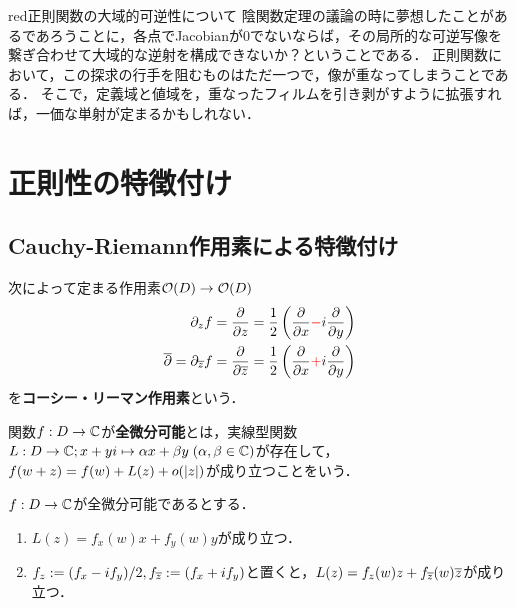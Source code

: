 \documentclass[uplatex, dvipdfmx]{jsreport}
\begin{document}
\begin{tbox}{red}{正則関数の大域的可逆性について}
    陰関数定理の議論の時に夢想したことがあるであろうことに，各点でJacobianが$0$でないならば，その局所的な可逆写像を繋ぎ合わせて大域的な逆射を構成できないか？ということである．
    正則関数において，この探求の行手を阻むものはただ一つで，像が重なってしまうことである．
    そこで，定義域と値域を，重なったフィルムを引き剥がすように拡張すれば，一価な単射が定まるかもしれない．
\end{tbox}

\section{正則性の特徴付け}

\subsection{Cauchy-Riemann作用素による特徴付け}

\begin{definition}
    次によって定まる作用素$\mathcal{O}(D)\to\mathcal{O}(D)$
    \begin{align*}
        \partial_zf&=\frac{\partial}{\partial z}=\frac{1}{2}\left(\frac{\partial}{\partial x}\textcolor{red}{-}i\frac{\partial}{\partial y}\right)\\
        \overline{\partial}=\partial_{\overline{z}}f&=\frac{\partial}{\partial\overline{z}}=\frac{1}{2}\left(\frac{\partial}{\partial x}\textcolor{red}{+}i\frac{\partial}{\partial y}\right)
    \end{align*}
    を\textbf{コーシー・リーマン作用素}という．
\end{definition}

\begin{definition}
    関数$f:D\to\mathbb{C}$が\textbf{全微分可能}とは，実線型関数$L:D\to \mathbb{C};x+yi\mapsto\alpha x+\beta y\;(\alpha,\beta\in\mathbb{C})$が存在して，$f(w+z)=f(w)+L(z)+o(\lvert z\rvert)$が成り立つことをいう．
\end{definition}

\begin{lemma}
    $f:D\to\mathbb{C}$が全微分可能であるとする．
    \begin{enumerate}
        \item $L(z)=f_x(w)x+f_y(w)y$が成り立つ．
        \item $f_z:=(f_x-if_y)/2,f_{\overline{z}}:=(f_x+if_y)$と置くと，$L(z)=f_z(w)z+f_{\overline{z}}(w)\overline{z}$が成り立つ．
    \end{enumerate}
\end{lemma}
\end{document}
